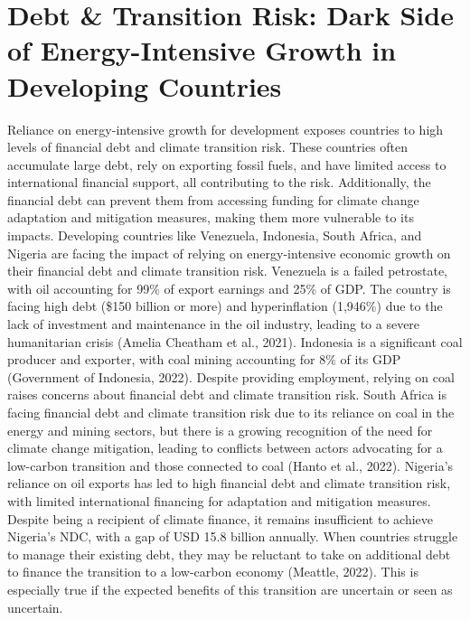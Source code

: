 \documentclass[11pt,a4paper]{article}
\begin{document}
\section*{Debt \& Transition Risk: Dark Side of Energy-Intensive Growth in Developing Countries}
Reliance on energy-intensive growth for development exposes countries to high levels of financial debt and climate transition risk. These countries often accumulate large debt, rely on exporting fossil fuels, and have limited access to international financial support, all contributing to the risk. Additionally, the financial debt can prevent them from accessing funding for climate change adaptation and mitigation measures, making them more vulnerable to its impacts. Developing countries like Venezuela, Indonesia, South Africa, and Nigeria are facing the impact of relying on energy-intensive economic growth on their financial debt and climate transition risk. Venezuela is a failed petrostate, with oil accounting for 99\% of export earnings and 25\% of GDP. The country is facing high debt (\$150 billion or more) and hyperinflation (1,946\%) due to the lack of investment and maintenance in the oil industry, leading to a severe humanitarian crisis (Amelia Cheatham et al., 2021). Indonesia is a significant coal producer and exporter, with coal mining accounting for 8\% of its GDP (Government of Indonesia, 2022). Despite providing employment, relying on coal raises concerns about financial debt and climate transition risk. South Africa is facing financial debt and climate transition risk due to its reliance on coal in the energy and mining sectors, but there is a growing recognition of the need for climate change mitigation, leading to conflicts between actors advocating for a low-carbon transition and those connected to coal (Hanto et al., 2022). Nigeria's reliance on oil exports has led to high financial debt and climate transition risk, with limited international financing for adaptation and mitigation measures. Despite being a recipient of climate finance, it remains insufficient to achieve Nigeria's NDC, with a gap of USD 15.8 billion annually. When countries struggle to manage their existing debt, they may be reluctant to take on additional debt to finance the transition to a low-carbon economy (Meattle, 2022). This is especially true if the expected benefits of this transition are uncertain or seen as uncertain. 
\end{document}
